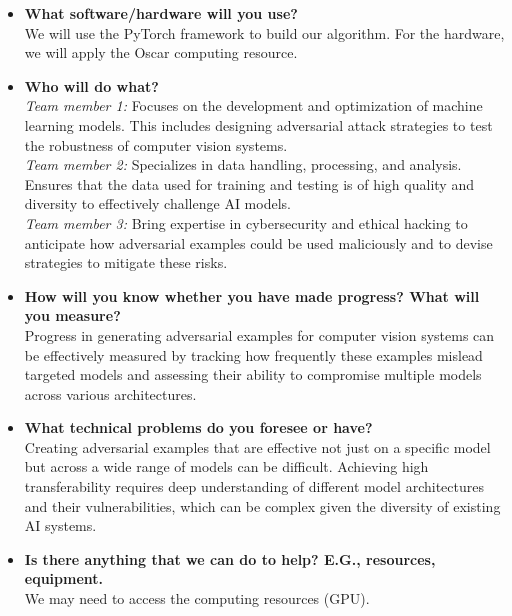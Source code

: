 \begin{itemize}
  \item \textbf{What software/hardware will you use?}\\
  We will use the PyTorch framework to build our algorithm. For the hardware, we will apply the Oscar computing resource. 

  \item \textbf{Who will do what?}\\
    \textit{Team member 1:} Focuses on the development and optimization of machine learning models. This includes designing adversarial attack strategies to test the robustness of computer vision systems.\\
    \textit{Team member 2:} Specializes in data handling, processing, and analysis. Ensures that the data used for training and testing is of high quality and diversity to effectively challenge AI models.\\
    \textit{Team member 3:} Bring expertise in cybersecurity and ethical hacking to anticipate how adversarial examples could be used maliciously and to devise strategies to mitigate these risks.\\

  \item \textbf{How will you know whether you have made progress? What will you measure?}\\
  Progress in generating adversarial examples for computer vision systems can be effectively measured by tracking how frequently these examples mislead targeted models and assessing their ability to compromise multiple models across various architectures.

  \item \textbf{What technical problems do you foresee or have?}\\
  Creating adversarial examples that are effective not just on a specific model but across a wide range of models can be difficult. Achieving high transferability requires deep understanding of different model architectures and their vulnerabilities, which can be complex given the diversity of existing AI systems.

  \item \textbf{Is there anything that we can do to help? E.G., resources, equipment.}\\
  We may need to access the computing resources (GPU).
\end{itemize}

